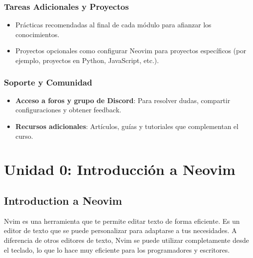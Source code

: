 \documentclass[
  a4paper,
  DIV=11,
  numbers=noendperiod,
  onepage,
  openany]{scrreprt}
\begin{document}
\section{Tareas Adicionales y
Proyectos}\label{tareas-adicionales-y-proyectos}

\begin{itemize}
\item
  Prácticas recomendadas al final de cada módulo para afianzar los
  conocimientos.
\item
  Proyectos opcionales como configurar Neovim para proyectos específicos
  (por ejemplo, proyectos en Python, JavaScript, etc.).
\end{itemize}

\section{Soporte y Comunidad}\label{soporte-y-comunidad}

\begin{itemize}
\item
  \textbf{Acceso a foros y grupo de Discord}: Para resolver dudas,
  compartir configuraciones y obtener feedback.
\item
  \textbf{Recursos adicionales}: Artículos, guías y tutoriales que
  complementan el curso.
\end{itemize}

\part{Unidad 0: Introducción a Neovim}

\chapter{Introduction a Neovim}\label{introduction-a-neovim}

Nvim es una herramienta que te permite editar texto de forma eficiente.
Es un editor de texto que se puede personalizar para adaptarse a tus
necesidades. A diferencia de otros editores de texto, Nvim se puede
utilizar completamente desde el teclado, lo que lo hace muy eficiente
para los programadores y escritores.
\end{document}
